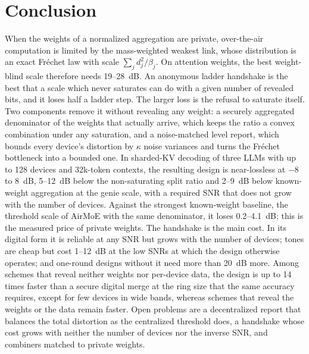 \section{Conclusion}
\label{sec:conclusion}

When the weights of a normalized aggregation are private, over-the-air computation is limited by the mass-weighted weakest link, whose distribution is an exact Fr\'echet law with scale $\sum_jd_j^2/\beta_j$. On attention weights, the best weight-blind scale therefore needs 19--28~dB. An anonymous ladder handshake is the best that a scale which never saturates can do with a given number of revealed bits, and it loses half a ladder step. The larger loss is the refusal to saturate itself. Two components remove it without revealing any weight: a securely aggregated denominator of the weights that actually arrive, which keeps the ratio a convex combination under any saturation, and a noise-matched level report, which bounds every device's distortion by $\kappa$ noise variances and turns the Fr\'echet bottleneck into a bounded one. In sharded-KV decoding of three LLMs with up to 128 devices and 32k-token contexts, the resulting design is near-lossless at $-8$ to $8$~dB, 5--12~dB below the non-saturating split ratio and 2--9~dB below known-weight aggregation at the genie scale, with a required SNR that does not grow with the number of devices. Against the strongest known-weight baseline, the threshold scale of AirMoE with the same denominator, it loses 0.2--4.1~dB; this is the measured price of private weights. The handshake is the main cost. In its digital form it is reliable at any SNR but grows with the number of devices; tones are cheap but cost 1--12~dB at the low SNRs at which the design otherwise operates; and one-round designs without it need more than 20~dB more. Among schemes that reveal neither weights nor per-device data, the design is up to 14 times faster than a secure digital merge at the ring size that the same accuracy requires, except for few devices in wide bands, whereas schemes that reveal the weights or the data remain faster. Open problems are a decentralized report that balances the total distortion as the centralized threshold does, a handshake whose cost grows with neither the number of devices nor the inverse SNR, and combiners matched to private weights.
